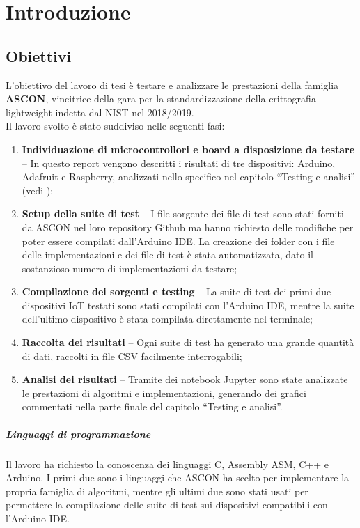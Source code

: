 \chapter{Introduzione}

\section{Obiettivi}

L'obiettivo del lavoro di tesi è testare e analizzare le prestazioni della famiglia \textbf{ASCON}, vincitrice della gara per la standardizzazione della crittografia lightweight indetta dal NIST nel 2018/2019\cite{nist-competition}. \\

\noindent Il lavoro svolto è stato suddiviso nelle seguenti fasi:
\begin{enumerate}
    \item \textbf{Individuazione di microcontrollori e board a disposizione da testare} -- In questo report vengono descritti i risultati di tre dispositivi: Arduino, Adafruit e Raspberry, analizzati nello specifico nel capitolo ``Testing e analisi'' (vedi );
    \item \textbf{Setup della suite di test} -- I file sorgente dei file di test sono stati forniti da ASCON nel loro repository Github\cite{github} ma hanno richiesto delle modifiche per poter essere compilati dall'Arduino IDE. La creazione dei folder con i file delle implementazioni e dei file di test è stata automatizzata, dato il sostanzioso numero di implementazioni da testare;
    \item \textbf{Compilazione dei sorgenti e testing} -- La suite di test dei primi due dispositivi IoT testati sono stati compilati con l'Arduino IDE, mentre la suite dell'ultimo dispositivo è stata compilata direttamente nel terminale;
    \item \textbf{Raccolta dei risultati} -- Ogni suite di test ha generato una grande quantità di dati, raccolti in file CSV facilmente interrogabili;
    \item \textbf{Analisi dei risultati} -- Tramite dei notebook Jupyter sono state analizzate le prestazioni di algoritmi e implementazioni, generando dei grafici commentati nella parte finale del capitolo ``Testing e analisi''.
\end{enumerate}
\paragraph{Linguaggi di programmazione} Il lavoro ha richiesto la conoscenza dei linguaggi C, Assembly ASM, C++ e Arduino. I primi due sono i linguaggi che ASCON ha scelto per implementare la propria famiglia di algoritmi, mentre gli ultimi due sono stati usati per permettere la compilazione delle suite di test sui dispositivi compatibili con l'Arduino IDE. \\

